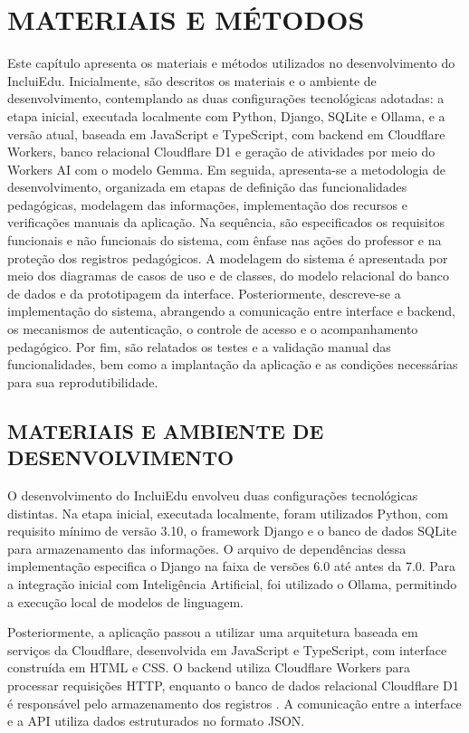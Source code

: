%
%

\chapter{MATERIAIS E MÉTODOS}
\label{chap:materiais-e-metodos}

Este capítulo apresenta os materiais e métodos utilizados no desenvolvimento do IncluiEdu. Inicialmente, são descritos os materiais e o ambiente de desenvolvimento, contemplando as duas configurações tecnológicas adotadas: a etapa inicial, executada localmente com Python, Django, SQLite e Ollama, e a versão atual, baseada em JavaScript e TypeScript, com backend em Cloudflare Workers, banco relacional Cloudflare D1 e geração de atividades por meio do Workers AI com o modelo Gemma. Em seguida, apresenta-se a metodologia de desenvolvimento, organizada em etapas de definição das funcionalidades pedagógicas, modelagem das informações, implementação dos recursos e verificações manuais da aplicação. Na sequência, são especificados os requisitos funcionais e não funcionais do sistema, com ênfase nas ações do professor e na proteção dos registros pedagógicos. A modelagem do sistema é apresentada por meio dos diagramas de casos de uso e de classes, do modelo relacional do banco de dados e da prototipagem da interface. Posteriormente, descreve-se a implementação do sistema, abrangendo a comunicação entre interface e backend, os mecanismos de autenticação, o controle de acesso e o acompanhamento pedagógico. Por fim, são relatados os testes e a validação manual das funcionalidades, bem como a implantação da aplicação e as condições necessárias para sua reprodutibilidade.

\section{MATERIAIS E AMBIENTE DE DESENVOLVIMENTO}

O desenvolvimento do IncluiEdu envolveu duas configurações tecnológicas distintas. Na etapa inicial, executada localmente, foram utilizados Python, com requisito mínimo de versão 3.10, o framework Django e o banco de dados SQLite para armazenamento das informações. O arquivo de dependências dessa implementação especifica o Django na faixa de versões 6.0 até antes da 7.0. Para a integração inicial com Inteligência Artificial, foi utilizado o Ollama, permitindo a execução local de modelos de linguagem.

Posteriormente, a aplicação passou a utilizar uma arquitetura baseada em serviços da Cloudflare, desenvolvida em JavaScript e TypeScript, com interface construída em HTML e CSS. O backend utiliza Cloudflare Workers para processar requisições HTTP, enquanto o banco de dados relacional Cloudflare D1 é responsável pelo armazenamento dos registros \cite{cloudflare2026d1}. A comunicação entre a interface e a API utiliza dados estruturados no formato JSON.

